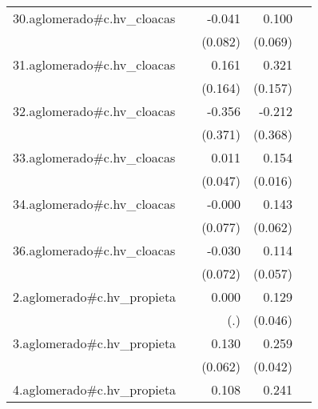 {\begin{longtable}{l*{4}{D{.}{.}{-1}}}
\addlinespace
30.aglomerado#c.hv\_cloacas&                     &      -0.041         &       0.100         &                     \\
            &                     &     (0.082)         &     (0.069)         &                     \\
\addlinespace
31.aglomerado#c.hv\_cloacas&                     &       0.161         &       0.321\sym{*}  &                     \\
            &                     &     (0.164)         &     (0.157)         &                     \\
\addlinespace
32.aglomerado#c.hv\_cloacas&                     &      -0.356         &      -0.212         &                     \\
            &                     &     (0.371)         &     (0.368)         &                     \\
\addlinespace
33.aglomerado#c.hv\_cloacas&                     &       0.011         &       0.154\sym{***}&                     \\
            &                     &     (0.047)         &     (0.016)         &                     \\
\addlinespace
34.aglomerado#c.hv\_cloacas&                     &      -0.000         &       0.143\sym{*}  &                     \\
            &                     &     (0.077)         &     (0.062)         &                     \\
\addlinespace
36.aglomerado#c.hv\_cloacas&                     &      -0.030         &       0.114\sym{*}  &                     \\
            &                     &     (0.072)         &     (0.057)         &                     \\
\addlinespace
2.aglomerado#c.hv\_propieta&                     &       0.000         &       0.129\sym{**} &                     \\
            &                     &         (.)         &     (0.046)         &                     \\
\addlinespace
3.aglomerado#c.hv\_propieta&                     &       0.130\sym{*}  &       0.259\sym{***}&                     \\
            &                     &     (0.062)         &     (0.042)         &                     \\
\addlinespace
4.aglomerado#c.hv\_propieta&                     &       0.108         &       0.241\sym{***}&                     \\

\end{longtable}}
